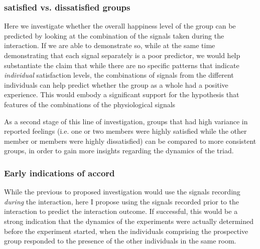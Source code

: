 \documentclass[a4paper, 11pt]{article}      %
\begin{document}
\subsubsection{satisfied vs. dissatisfied groups}
Here we investigate whether the overall happiness level of the group can be predicted by looking at the combination of the signals taken during the interaction. If we are able to demonstrate so, while at the same time demonstrating that each signal separately is a poor predictor, we would help substantiate the claim that while there are no specific patterns that indicate \emph{individual} satisfaction levels, the combinations of signals from the different individuals can help predict whether the group as a whole had a positive experience. This would embody a significant support for the hypothesis that features of the combinations of the physiological signals 

As a second stage of this line of investigation, groups that had high variance in reported feelings (i.e. one or two members were highly satisfied while the other member or members were highly dissatisfied) can be compared to more consistent groups, in order to gain more insights regarding the dynamics of the triad.

\subsubsection{Early indications of accord}
While the previous to proposed investigation would use the signals recording \emph{during} the interaction, here I propose using the signals recorded prior to the interaction to predict the interaction outcome. If successful, this would be a strong indication that the dynamics of the experiments were actually determined before the experiment started, when the individuals comprising the prospective group responded to the presence of the other individuals in the same room.


\subsection{}
\end{document}
